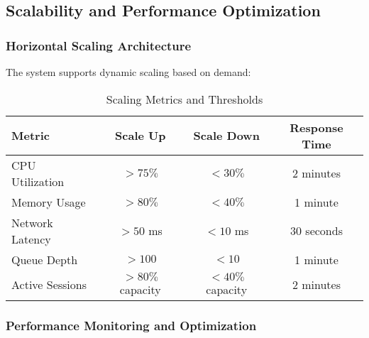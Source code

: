 \subsection{Scalability and Performance Optimization}

\subsubsection{Horizontal Scaling Architecture}
The system supports dynamic scaling based on demand:

\begin{table}[htbp]
\centering
\caption{Scaling Metrics and Thresholds}
\label{tab:scaling-metrics}
\begin{tabular}{|l|c|c|c|}
\hline
\textbf{Metric} & \textbf{Scale Up} & \textbf{Scale Down} & \textbf{Response Time} \\
\hline
CPU Utilization & $> 75\%$ & $< 30\%$ & 2 minutes \\
Memory Usage & $> 80\%$ & $< 40\%$ & 1 minute \\
Network Latency & $> 50$ ms & $< 10$ ms & 30 seconds \\
Queue Depth & $> 100$ & $< 10$ & 1 minute \\
Active Sessions & $> 80\%$ capacity & $< 40\%$ capacity & 2 minutes \\
\hline
\end{tabular}
\end{table}

\subsubsection{Performance Monitoring and Optimization}

